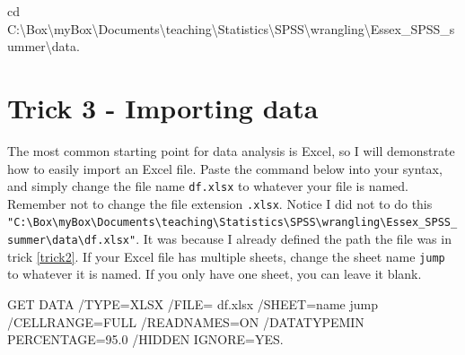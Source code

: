 \documentclass[
]{book}
\newenvironment{Shaded}{\begin{snugshade}}{\end{snugshade}}
\newcommand{\FloatTok}[1]{\textcolor[rgb]{0.00,0.00,0.81}{#1}}
\newcommand{\NormalTok}[1]{#1}
\newcommand{\OtherTok}[1]{\textcolor[rgb]{0.56,0.35,0.01}{#1}}
\newcommand{\SpecialCharTok}[1]{\textcolor[rgb]{0.00,0.00,0.00}{#1}}
\newcommand{\StringTok}[1]{\textcolor[rgb]{0.31,0.60,0.02}{#1}}
\begin{document}
\begin{Shaded}
\begin{Highlighting}[]
\NormalTok{cd }\StringTok{\textquotesingle{}C:\textbackslash{}Box\textbackslash{}myBox\textbackslash{}Documents}\SpecialCharTok{\textbackslash{}t}\StringTok{eaching\textbackslash{}Statistics\textbackslash{}SPSS\textbackslash{}wrangling\textbackslash{}Essex\_SPSS\_summer\textbackslash{}data\textquotesingle{}}\NormalTok{.}
\end{Highlighting}
\end{Shaded}

\hypertarget{trick3}{%
\chapter{Trick 3 - Importing data}\label{trick3}}

The most common starting point for data analysis is Excel, so I will demonstrate how to easily import an Excel file. Paste the command below into your syntax, and simply change the file name \texttt{df.xlsx} to whatever your file is named. Remember not to change the file extension \texttt{.xlsx}. Notice I did not to do this \texttt{"\textquotesingle{}C:\textbackslash{}Box\textbackslash{}myBox\textbackslash{}Documents\textbackslash{}teaching\textbackslash{}Statistics\textbackslash{}SPSS\textbackslash{}wrangling\textbackslash{}Essex\_SPSS\_summer\textbackslash{}data\textbackslash{}df.xlsx\textquotesingle{}"}. It was because I already defined the path the file was in trick \ref{trick2}. If your Excel file has multiple sheets, change the sheet name \texttt{jump} to whatever it is named. If you only have one sheet, you can leave it blank.

\begin{Shaded}
\begin{Highlighting}[]
\NormalTok{GET DATA}
  \SpecialCharTok{/}\NormalTok{TYPE}\OtherTok{=}\NormalTok{XLSX}
  \SpecialCharTok{/}\NormalTok{FILE}\OtherTok{=} \StringTok{\textquotesingle{}df.xlsx\textquotesingle{}}
  \SpecialCharTok{/}\NormalTok{SHEET}\OtherTok{=}\NormalTok{name }\StringTok{\textquotesingle{}jump\textquotesingle{}}
  \SpecialCharTok{/}\NormalTok{CELLRANGE}\OtherTok{=}\NormalTok{FULL}
  \SpecialCharTok{/}\NormalTok{READNAMES}\OtherTok{=}\NormalTok{ON}
  \SpecialCharTok{/}\NormalTok{DATATYPEMIN PERCENTAGE}\OtherTok{=}\FloatTok{95.0}
  \SpecialCharTok{/}\NormalTok{HIDDEN IGNORE}\OtherTok{=}\NormalTok{YES.}
\end{Highlighting}
\end{Shaded}
\end{document}
